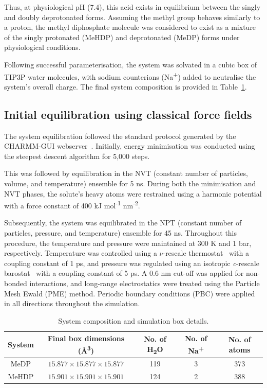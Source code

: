 Thus, at physiological pH (7.4), this acid exists in equilibrium between the singly and doubly deprotonated forms. Assuming the methyl group behaves similarly to a proton, the methyl diphosphate molecule was considered to exist as a mixture of the singly protonated (MeHDP) and deprotonated (MeDP) forms under physiological conditions.

Following successful parameterisation, the system was solvated in a cubic box of TIP3P water molecules, with sodium counterions (Na\textsuperscript{+}) added to neutralise the system's overall charge. The final system composition is provided in Table~\ref{tab:system-before-equilibration}.



\subsection{Initial equilibration using classical force fields}
The system equilibration followed the standard protocol generated by the CHARMM-GUI webserver~\citep{joCHARMMGUIWebbasedGraphical2008}. Initially, energy minimisation was conducted using the steepest descent algorithm for 5,000 steps.

This was followed by equilibration in the NVT (constant number of particles, volume, and temperature) ensemble for 5 ns. During both the minimisation and NVT phases, the solute's heavy atoms were restrained using a harmonic potential with a force constant of 400 kJ mol\textsuperscript{-1} nm\textsuperscript{-2}.

Subsequently, the system was equilibrated in the NPT (constant number of particles, pressure, and temperature) ensemble for 45 ns. Throughout this procedure, the temperature and pressure were maintained at 300 K and 1 bar, respectively. Temperature was controlled using a $\nu$-rescale thermostat~\citep{bussiCanonicalSamplingVelocity2007} with a coupling constant of 1 ps, and pressure was regulated using an isotropic \textit{c}-rescale barostat~\citep{bernettiPressureControlUsing2020} with a coupling constant of 5 ps. A 0.6 nm cut-off was applied for non-bonded interactions, and long-range electrostatics were treated using the Particle Mesh Ewald (PME) method. Periodic boundary conditions (PBC) were applied in all directions throughout the simulation.

\begin{table}[b]
    \centering
    \caption{System composition and simulation box details.}
    \label{tab:system-before-equilibration}
    \begin{tabular}{ccccc}
    \toprule
    \textbf{System} & \textbf{Final box dimensions (\AA\textsuperscript{3})} & \textbf{No. of H\textsubscript{2}O} & \textbf{No. of Na\textsuperscript{+}} & \textbf{No. of atoms} \\
    \midrule
    MeDP  & $15.877 \times 15.877 \times 15.877$ & 119 & 3 & 373 \\
    MeHDP & $15.901 \times 15.901 \times 15.901$ & 124 & 2 & 388 \\
    \bottomrule
    \end{tabular}
\end{table}

